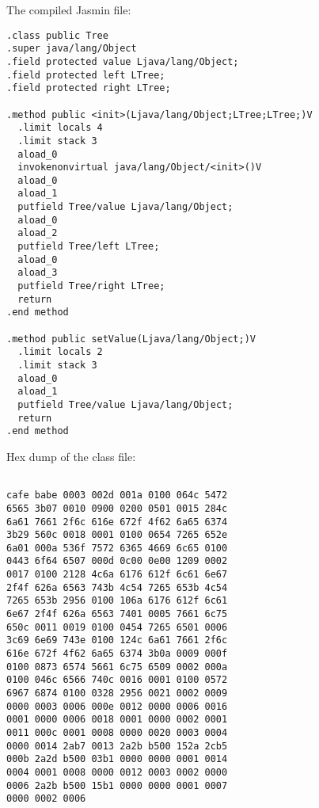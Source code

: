 \begin{slide*}
The compiled Jasmin file:

\begin{scriptsize}
\begin{verbatim}
.class public Tree
.super java/lang/Object
.field protected value Ljava/lang/Object;
.field protected left LTree;
.field protected right LTree;
 
.method public <init>(Ljava/lang/Object;LTree;LTree;)V
  .limit locals 4
  .limit stack 3
  aload_0
  invokenonvirtual java/lang/Object/<init>()V
  aload_0
  aload_1
  putfield Tree/value Ljava/lang/Object;
  aload_0
  aload_2
  putfield Tree/left LTree;
  aload_0
  aload_3
  putfield Tree/right LTree;
  return
.end method
 
.method public setValue(Ljava/lang/Object;)V
  .limit locals 2
  .limit stack 3
  aload_0
  aload_1
  putfield Tree/value Ljava/lang/Object;
  return
.end method
\end{verbatim}
\end{scriptsize}

\vfil
\end{slide*}
 
\begin{slide*}
Hex dump of the class file:

\begin{scriptsize}
\begin{verbatim}

cafe babe 0003 002d 001a 0100 064c 5472
6565 3b07 0010 0900 0200 0501 0015 284c
6a61 7661 2f6c 616e 672f 4f62 6a65 6374
3b29 560c 0018 0001 0100 0654 7265 652e
6a01 000a 536f 7572 6365 4669 6c65 0100
0443 6f64 6507 000d 0c00 0e00 1209 0002
0017 0100 2128 4c6a 6176 612f 6c61 6e67
2f4f 626a 6563 743b 4c54 7265 653b 4c54
7265 653b 2956 0100 106a 6176 612f 6c61
6e67 2f4f 626a 6563 7401 0005 7661 6c75
650c 0011 0019 0100 0454 7265 6501 0006
3c69 6e69 743e 0100 124c 6a61 7661 2f6c
616e 672f 4f62 6a65 6374 3b0a 0009 000f
0100 0873 6574 5661 6c75 6509 0002 000a
0100 046c 6566 740c 0016 0001 0100 0572
6967 6874 0100 0328 2956 0021 0002 0009
0000 0003 0006 000e 0012 0000 0006 0016
0001 0000 0006 0018 0001 0000 0002 0001
0011 000c 0001 0008 0000 0020 0003 0004
0000 0014 2ab7 0013 2a2b b500 152a 2cb5
000b 2a2d b500 03b1 0000 0000 0001 0014
0004 0001 0008 0000 0012 0003 0002 0000
0006 2a2b b500 15b1 0000 0000 0001 0007
0000 0002 0006
\end{verbatim}
\end{scriptsize}

\vfil
\end{slide*}
 
